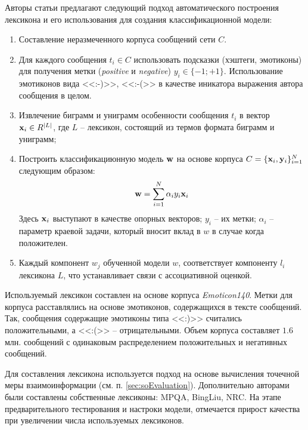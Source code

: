         Авторы статьи предлагают следующий подход автоматического построения
        лексикона и его использования для создания классификационной модели:
        \begin{enumerate}
            \item Составление неразмеченного корпуса сообщений сети \twitter $C$.
            \item Для каждого сообщения $t_i \in C$ использовать подсказки
                (хэштеги, эмотиконы) для получения метки ({\it positive} и {\it negative})
                $y_i \in \{-1; +1\}$. Использование эмотиконов вида <<:-)>>, <<:-(>>
                в качестве иникатора выражения автора сообщения в целом.
            \item Извлечение биграмм и униграмм особенности сообщения $t_i$ в
                вектор ${\bf x}_i \in R^{|L|}$, где $L$ -- лексикон, состоящий из
                термов формата биграмм и униграмм;
            \item Построить классификациюнную модель ${\bf w}$ на основе корпуса
                $C = \{{\bf x}_i, {\bf y}_i \}_{i=1}^{N}$ следующим образом:
            \begin{equation}
                {\bf w} = \sum\limits_{i=1}^{N}\alpha_i y_i {\bf x}_i
            \end{equation}
            Здесь ${\bf x}_i$ выступают в качестве опорных векторов; $y_i$ -- их метки;
            $\alpha_i$ -- параметр краевой задачи, который вносит вклад в
            $w$ в случае когда положителен.
            \item Каждый компонент $w_j$ обученной модели $w$, соответствует компоненту $l_i$
                лексикона $L$, что устанавливает связи с ассоциативной оценкой.
        \end{enumerate}

        Используемый лексикон составлен на основе \twitter корпуса {\it Emoticon140}.
        Метки для корпуса расставлялись на основе эмотиконов, содержащихся в
        тексте сообщений.
        Так, сообщения содержащие эмотиконы типа <<:)>> считались положительными,
        а <<:(>> -- отрицательными.
        Объем корпуса составляет $1.6$ млн. сообщений с одинаковым распределением
        положительных и негативных сообщений.

        Для составления лексикона используется подход на основе вычисления
        точечной меры взаимоинформации (см. п. \ref{sec:soEvaluation}).
        Дополнительно авторами были составлены собственные лексиконы: MPQA, BingLiu, NRC.
        На этапе предварительного тестирования и настроки модели, отмечается прирост
        качества при увеличении числа используемых лексиконов.

